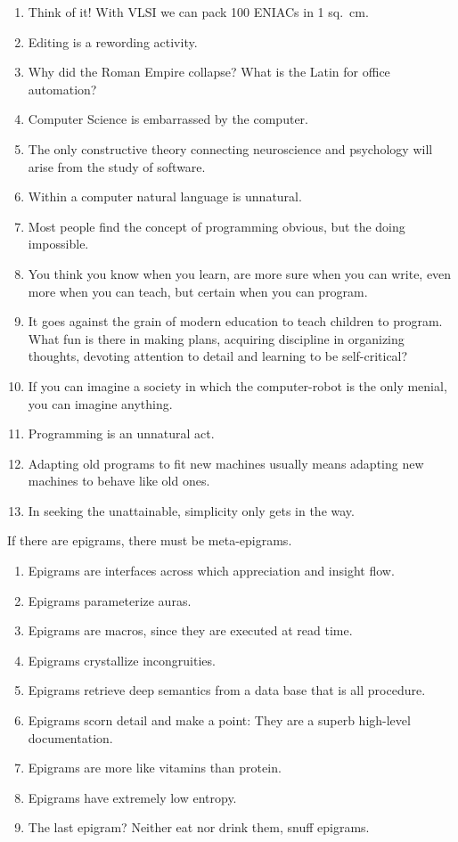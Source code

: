 \documentclass[letterpaper,11pt]{article}
\begin{document}
\begin{multicols}{2}
\begin{enumerate}[wide=0pt,label=\textbf{\arabic*.}]
\item Think of it! With VLSI we can pack 100 ENIACs in 1 sq.\ cm.
\item Editing is a rewording activity.
\item Why did the Roman Empire collapse? What is the Latin for office automation?
\item Computer Science is embarrassed by the computer.
\item The only constructive theory connecting neuroscience and psychology will arise from the study of software.
\item Within a computer natural language is unnatural.
\item Most people find the concept of programming obvious, but the doing impossible.
\item You think you know when you learn, are more sure when you can write, even more when you can teach, but certain when you can program.
\item It goes against the grain of modern education to teach children to program. What fun is there in making plans, acquiring discipline in organizing thoughts, devoting attention to detail and learning to be self-critical?
\item If you can imagine a society in which the computer-robot is the only menial, you can imagine anything.
\item Programming is an unnatural act.
\item Adapting old programs to fit new machines usually means adapting new machines to behave like old ones.
\item In seeking the unattainable, simplicity only gets in the way.
\end{enumerate}
%
If there are epigrams, there must be meta-epigrams.
%
\begin{enumerate}[resume,wide=0pt,label=\textbf{\arabic*.}]
\item Epigrams are interfaces across which appreciation and insight flow.
\item Epigrams parameterize auras.
\item Epigrams are macros, since they are executed at read time.
\item Epigrams crystallize incongruities.
\item Epigrams retrieve deep semantics from a data base that is all procedure.
\item Epigrams scorn detail and make a point: They are a superb high-level documentation.
\item Epigrams are more like vitamins than protein.
\item Epigrams have extremely low entropy.
\item The last epigram? Neither eat nor drink them, snuff epigrams. 
\end{enumerate}
\end{multicols}
\end{document}
